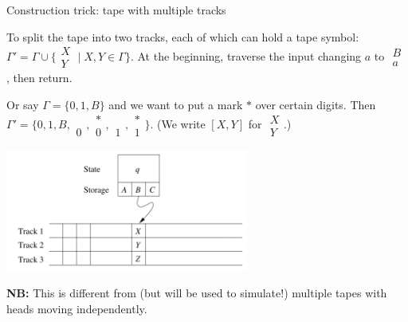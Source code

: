 \documentclass[handout]{beamer}
\begin{document}
\begin{frame}{Construction trick: tape with multiple tracks}

    To split the tape into two tracks, each of which can hold a tape symbol:
    $\Gamma'=\Gamma\cup\{\begin{smallmatrix}X\\Y\end{smallmatrix}\mid X,Y\in\Gamma\}$. At the beginning, traverse the input changing $a$ to $\begin{smallmatrix}B\\a\end{smallmatrix}$, then return.

    Or say $\Gamma=\{0,1,B\}$ and we want to put a mark $*$ over certain digits. Then $\Gamma'=\{0,1,B,\begin{smallmatrix}\phantom{*}\\0\end{smallmatrix},\begin{smallmatrix}*\\0\end{smallmatrix},\begin{smallmatrix}\phantom{*}\\1\end{smallmatrix},\begin{smallmatrix}*\\1\end{smallmatrix}\}$. (We write $[X,Y]$ for $\begin{smallmatrix}X\\Y\end{smallmatrix}$.)

    \begin{center}
        \includegraphics[width=0.6\textwidth]{files/tmmt.PNG}    
    \end{center}
    
    \textbf{NB:} This is different from (but will be used to simulate!) multiple tapes with heads moving independently. 
        
    
\end{frame}
\end{document}

